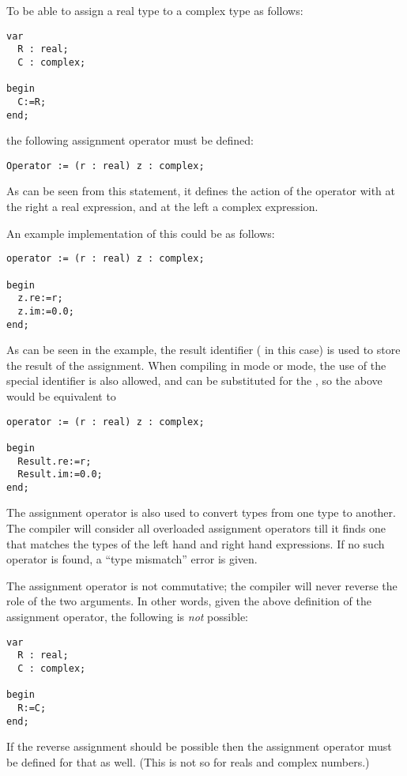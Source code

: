 To be able to assign a real type to a complex type as follows:
\begin{verbatim}
var
  R : real;
  C : complex;

begin
  C:=R;
end;
\end{verbatim}
the following assignment operator must be defined:
\begin{verbatim}
Operator := (r : real) z : complex;
\end{verbatim}
As can be seen from this statement, it defines the action of the operator
\var{:=} with at the right a real expression, and at the left a complex
expression.

An example implementation of this could be as follows:
\begin{verbatim}
operator := (r : real) z : complex;

begin
  z.re:=r;
  z.im:=0.0;
end;
\end{verbatim}
As can be seen in the example, the result identifier ( in this case)
is used to store the result of the assignment. When compiling in  mode
or  mode, the use of the special identifier  is also
allowed, and can be substituted for the , so the above would be
equivalent to
\begin{verbatim}
operator := (r : real) z : complex;

begin
  Result.re:=r;
  Result.im:=0.0;
end;
\end{verbatim}

The assignment operator is also used to convert types from one type to
another. The compiler will consider all overloaded assignment operators
till it finds one that matches the types of the left hand and right hand
expressions. If no such operator is found, a ``type mismatch'' error
is given.

\begin{remark}
The assignment operator is not commutative; the compiler will never reverse
the role of the two arguments. In other words, given the above definition of
the assignment operator, the following is {\em not} possible:
\begin{verbatim}
var
  R : real;
  C : complex;

begin
  R:=C;
end;
\end{verbatim}
If the reverse assignment should be possible then the assignment operator
must be defined for that as well.
(This is not so for reals and complex numbers.)
\end{remark}

